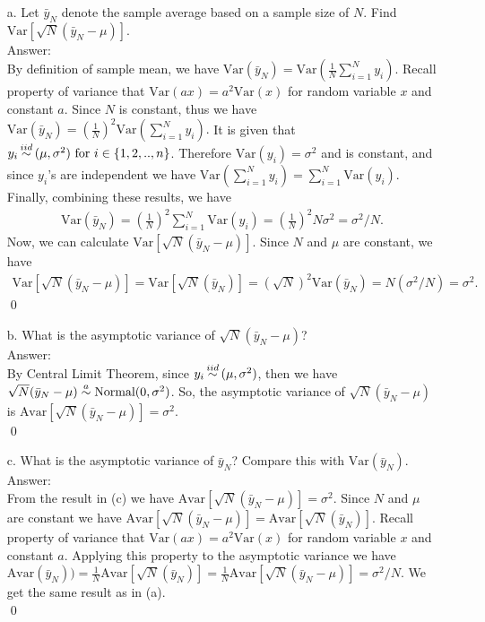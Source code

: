 \documentclass[10pt]{article}
\newcommand\iid{\stackrel{\mathclap{iid}}{\sim}}
\newcommand\asym{\stackrel{\mathclap{a}}{\sim}}
\newcommand{\V}{\text{Var}}
\newcommand{\Av}{\text{Avar}}
\newcommand{\norm}{\text{Normal}}
\begin{document}
\begin{enumerate}
\item[a.] Let $\bar{y}_N$ denote the sample average based on a sample size of $N$. Find $\V[\sqrt{N}(\bar{y}_N-\mu)].$
\\ Answer: \\
By definition of sample mean, we have $\V(\bar{y}_N) = \V \left(\frac{1}{N}\sum_{i=1}^{N}{y_i}\right).$
Recall property of variance that $\V(ax)=a^2 \V(x)$ for random variable $x$ and constant $a$. Since $N$ is constant, thus we have
$\V(\bar{y}_N) = \left(\frac{1}{N}\right)^2 \V \left(\sum_{i=1}^{N}{y_i}\right).$
It is given that $y_i\iid(\mu,\sigma^2) \text{ for } i\in\left\{1,2,..,n\right\}$. Therefore $\V(y_i)=\sigma^2$ and is constant, and  since $y_i$'s are independent we have $\V \left(\sum_{i=1}^{N}{y_i}\right) = \sum_{i=1}^{N}{\V(y_i)}.$
Finally, combining these results, we have
\begin{align*}
    \V(\bar{y}_N) = \left(\frac{1}{N}\right)^2 \sum_{i=1}^{N}{\V(y_i)}=\left(\frac{1}{N}\right)^2 N\sigma^2=\sigma^2/N.
\end{align*}
Now, we can calculate $\V[\sqrt{N}(\bar{y}_N-\mu)].$ Since $N$ and $\mu$ are constant, we have
\begin{align*}
    \V[\sqrt{N}(\bar{y}_N-\mu)]=\V[\sqrt{N}(\bar{y}_N)]=(\sqrt{N})^2\V(\bar{y}_N)=N(\sigma^2/N)=\sigma^2.
\end{align*}\qed

\item[b.] What is the asymptotic variance of $\sqrt{N}(\bar{y}_N-\mu)$?
\\ Answer:\\
By Central Limit Theorem, since $y_i\iid(\mu,\sigma^2)$, then we have $\sqrt{N}(\bar{y}_N-\mu)\asym\norm(0,\sigma^2)$. So, the asymptotic variance of  $\sqrt{N}(\bar{y}_N-\mu)$ is $\Av[\sqrt{N}(\bar{y}_N-\mu)]=\sigma^2.$\\ \qed

\item[c.] What is the asymptotic variance of $\bar{y}_N$? Compare this with $\V(\bar{y}_N).$
\\ Answer:\\
From the result in (c) we have $\Av[\sqrt{N}(\bar{y}_N-\mu)]=\sigma^2.$ Since $N$ and $\mu$ are constant we have $\Av[\sqrt{N}(\bar{y}_N-\mu)]=\Av[\sqrt{N}(\bar{y}_N)]$. Recall property of variance that $\V(ax)=a^2 \V(x)$ for random variable $x$ and constant $a$. Applying this property to the asymptotic variance we have $\Av(\bar{y}_N))=\frac{1}{N}\Av[\sqrt{N}(\bar{y}_N)]=\frac{1}{N}\Av[\sqrt{N}(\bar{y}_N-\mu)]=\sigma^2/N.$ We get the same result as in (a).\\ \qed


\end{enumerate}
\end{document}
